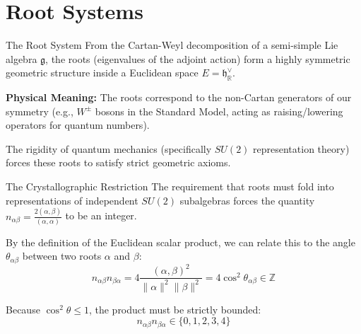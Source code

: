 \section{Root Systems}

\begin{frame}{The Root System}
    From the Cartan-Weyl decomposition of a semi-simple Lie algebra $\mathfrak{g}$, the roots (eigenvalues of the adjoint action) form a highly symmetric geometric structure inside a Euclidean space $E = \mathfrak{h}_{\mathbb{R}}^\vee$.

    \vspace{0.3cm}
    \textbf{Physical Meaning:} The roots correspond to the non-Cartan generators of our symmetry (e.g., $W^\pm$ bosons in the Standard Model, acting as raising/lowering operators for quantum numbers).

    \vspace{0.5cm}
    The rigidity of quantum mechanics (specifically $SU(2)$ representation theory) forces these roots to satisfy strict geometric axioms.

    \vfill
    \hyperlink{backup_rootsystem}{}
\end{frame}

\begin{frame}{The Crystallographic Restriction}
    The requirement that roots must fold into representations of independent $SU(2)$ subalgebras forces the quantity $n_{\alpha\beta} = \frac{2(\alpha, \beta)}{(\alpha, \alpha)}$ to be an integer.

    By the definition of the Euclidean scalar product, we can relate this to the angle $\theta_{\alpha\beta}$ between two roots $\alpha$ and $\beta$:
    \begin{equation}
        n_{\alpha\beta} n_{\beta\alpha} = 4 \frac{(\alpha, \beta)^2}{\|\alpha\|^2 \|\beta\|^2} = 4 \cos^2 \theta_{\alpha\beta} \in \mathbb{Z}
    \end{equation}

    Because $\cos^2 \theta \le 1$, the product must be strictly bounded:
    \begin{equation}
        n_{\alpha\beta} n_{\beta\alpha} \in \{0, 1, 2, 3, 4\}
    \end{equation}

    \vfill
    \hyperlink{backup_proof}{}
\end{frame}

